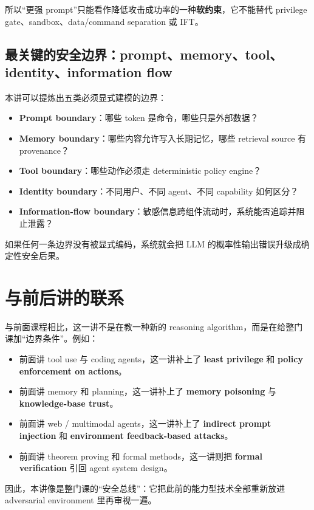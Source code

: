 所以“更强 prompt”只能看作降低攻击成功率的一种\textbf{软约束}，它不能替代 privilege gate、sandbox、data/command separation 或 IFT。

\subsection{最关键的安全边界：prompt、memory、tool、identity、information flow}

本讲可以提炼出五类必须显式建模的边界：

\begin{itemize}
\item \textbf{Prompt boundary}：哪些 token 是命令，哪些只是外部数据？
\item \textbf{Memory boundary}：哪些内容允许写入长期记忆，哪些 retrieval source 有 provenance？
\item \textbf{Tool boundary}：哪些动作必须走 deterministic policy engine？
\item \textbf{Identity boundary}：不同用户、不同 agent、不同 capability 如何区分？
\item \textbf{Information-flow boundary}：敏感信息跨组件流动时，系统能否追踪并阻止泄露？
\end{itemize}

如果任何一条边界没有被显式编码，系统就会把 LLM 的概率性输出错误升级成确定性安全后果。

\section{与前后讲的联系}

与前面课程相比，这一讲不是在教一种新的 reasoning algorithm，而是在给整门课加“边界条件”。例如：

\begin{itemize}
\item 前面讲 tool use 与 coding agents，这一讲补上了 \textbf{least privilege} 和 \textbf{policy enforcement on actions}。
\item 前面讲 memory 和 planning，这一讲补上了 \textbf{memory poisoning} 与 \textbf{knowledge-base trust}。
\item 前面讲 web / multimodal agents，这一讲补上了 \textbf{indirect prompt injection} 和 \textbf{environment feedback-based attacks}。
\item 前面讲 theorem proving 和 formal methods，这一讲则把 \textbf{formal verification} 引回 agent system design。
\end{itemize}

因此，本讲像是整门课的“安全总线”：它把此前的能力型技术全部重新放进 adversarial environment 里再审视一遍。


